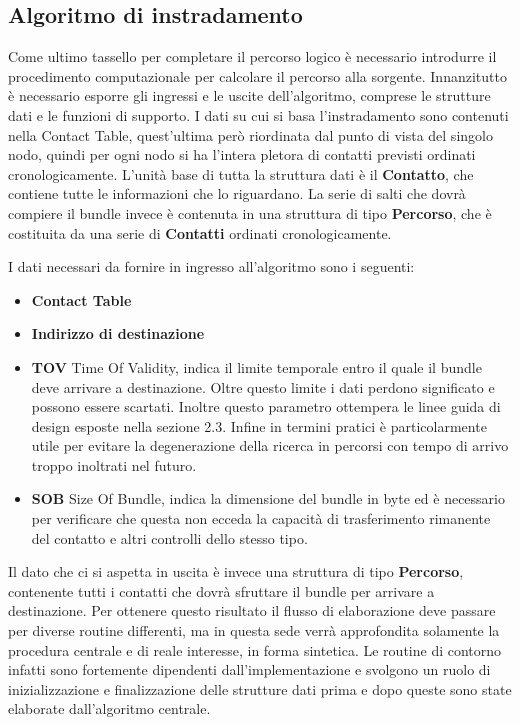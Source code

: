 \documentclass[a4paper]{article}
\begin{document}
		
		\subsection{Algoritmo di instradamento}
		Come ultimo tassello per completare il percorso logico è necessario introdurre il procedimento computazionale per calcolare il percorso alla sorgente. Innanzitutto è necessario esporre gli ingressi e le uscite dell'algoritmo, comprese le strutture dati e le funzioni di supporto. I dati su cui si basa l'instradamento sono contenuti nella Contact Table, quest'ultima però riordinata dal punto di vista del singolo nodo, quindi per ogni nodo si ha l'intera pletora di contatti previsti ordinati cronologicamente. L'unità base di tutta la struttura dati è il {\bf Contatto}, che contiene tutte le informazioni che lo riguardano. La serie di salti che dovrà compiere il bundle invece è contenuta in una struttura di tipo {\bf Percorso}, che è costituita da una serie di {\bf Contatti} ordinati cronologicamente. 
		
		I dati necessari da fornire in ingresso all'algoritmo sono i seguenti:
		\begin{itemize}
			\item {\bf Contact Table}
			\item {\bf Indirizzo di destinazione}
			\item {\bf TOV} Time Of Validity, indica il limite temporale entro il quale il bundle deve arrivare a destinazione. Oltre questo limite i dati perdono significato e possono essere scartati. Inoltre questo parametro ottempera le linee guida di design esposte nella sezione 2.3. Infine in termini pratici è particolarmente utile per evitare la degenerazione della ricerca in percorsi con tempo di arrivo troppo inoltrati nel futuro. 
			\item {\bf SOB}	Size Of Bundle, indica la dimensione del bundle in byte ed è necessario per verificare che questa non ecceda la capacità di trasferimento rimanente del contatto e altri controlli dello stesso tipo. 
		\end{itemize}
		
		Il dato che ci si aspetta in uscita è invece una struttura di tipo {\bf Percorso}, contenente tutti i contatti che dovrà sfruttare il bundle per arrivare a destinazione. Per ottenere questo risultato il flusso di elaborazione deve passare per diverse routine differenti, ma in questa sede verrà approfondita solamente la procedura centrale e di reale interesse, in forma sintetica. Le routine di contorno infatti sono fortemente dipendenti dall'implementazione e svolgono un ruolo di inizializzazione e finalizzazione delle strutture dati prima e dopo queste sono state elaborate dall'algoritmo centrale.
		
\end{document}

